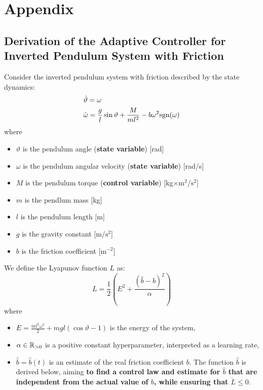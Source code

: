 \documentclass[12pt]{article}
\begin{document}
\newpage
\section*{Appendix}

\subsection*{Derivation of the Adaptive Controller for Inverted Pendulum System with Friction}

Consider the inverted pendulum system with friction described by the state dynamics:
\begin{equation}
    \label{eqn_state_dynamics}
    \begin{aligned}
        &\dot{\vartheta} =  \omega \\
        &\dot{\omega} = \frac{g}{l}\sin \vartheta + \frac{M}{ m l ^ 2} - b \omega ^ 2 {\text{sgn}} (\omega)
    \end{aligned}
\end{equation}
where
\begin{itemize}
    \item $\vartheta$ is the pendulum angle (\textbf{state variable}) [rad]
    \item $\omega$ is the pendulum angular velocity (\textbf{state variable}) [rad/s]
    \item $M$ is the pendulum torque (\textbf{control variable}) [kg$\times\text{m} ^ 2$/$\text{s} ^ 2$]  
    \item $m$ is the pendlum mass [kg]
    \item $l$ is the pendulum length [m]
    \item $g$ is the gravity constant [m/$\text{s}^2$]
    \item $b$ is the friction coefficient [$\text{m} ^ {-2}$] 
\end{itemize}
We define the Lyapunov function $L$ as:
$$
    L = \frac{1}{2} \left(E^2 + \frac{(\hat{b} - b) ^ 2}{\alpha}\right) 
$$
where
\begin{itemize}
    \item $E = \frac{m l ^2 \omega ^ 2}{2} + mgl(\cos\vartheta - 1)$ is the energy of the system,
    \item $\alpha \in {\mathbb{R}}_{>0}$ is a positive constant hyperparameter, interpreted as a learning rate,
    \item $\hat{b} = \hat{b}(t)$ is an estimate of the real friction coefficient $b$. The function $\hat{b}$ is derived below, aiming \textbf{to find a control law and estimate for $\hat{b}$ that are independent from the actual value of $b$, while ensuring that $\dot{L} \leq 0$}. 
\end{itemize}
\end{document}
